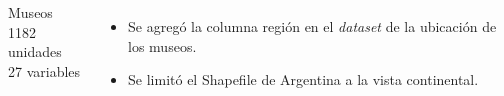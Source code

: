 \documentclass[10pt]{beamer}
\begin{document}
\begin{frame}
  \vfill

  \begin{columns}
    Museos\\
    1182 unidades\\
    27 variables

      \begin{itemize}
        \item Se agregó la columna región en el \emph{dataset} de la ubicación de los museos.
        \item Se limitó el Shapefile de Argentina a la vista continental.
      \end{itemize}
  \end{columns}

\end{frame}
\end{document}
